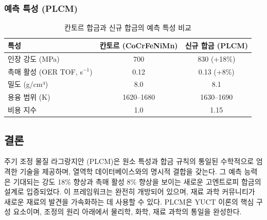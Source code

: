 \documentclass[12pt,a4paper]{article}
\begin{document}
	\subsubsection{예측 특성 (PLCM)}
	\begin{table}[htbp]
		\centering
		\caption{칸토르 합금과 신규 합금의 예측 특성 비교}
		\label{tab:comparison}
		\begin{tabular}{lcc}
			\toprule
			특성 & 칸토르 (CoCrFeNiMn) & 신규 합금 (PLCM) \\
			\midrule
			인장 강도 (MPa) & 700 & 830 (+18\%) \\
			촉매 활성 (OER TOF, s\(^{-1}\)) & 0.12 & 0.13 (+8\%) \\
			밀도 (g/cm³) & 8.0 & 8.1 \\
			용융 범위 (K) & 1620–1680 & 1630–1690 \\
			비용 지수 & 1.0 & 1.15 \\
			\bottomrule
		\end{tabular}
	\end{table}
	
	\subsection{결론}
	
	주기 조정 물질 라그랑지안 (PLCM)은 원소 특성과 합금 규칙의 통일된 수학적으로 엄격한 기술을 제공하며, 열역학 데이터베이스와의 명시적 결합을 갖는다. 그 예측 능력은 기대되는 강도 18\% 향상과 촉매 활성 8\% 향상을 보이는 새로운 고엔트로피 합금의 설계로 입증되었다. 이 프레임워크는 완전히 개방되어 있으며, 재료 과학 커뮤니티가 새로운 재료의 발견을 가속화하는 데 사용할 수 있다. PLCM은 YUCT 이론의 핵심 구성 요소이며, 조정의 원리 아래에서 물리학, 화학, 재료 과학의 통일을 완성한다.
	
	\appendix
	
\end{document}
